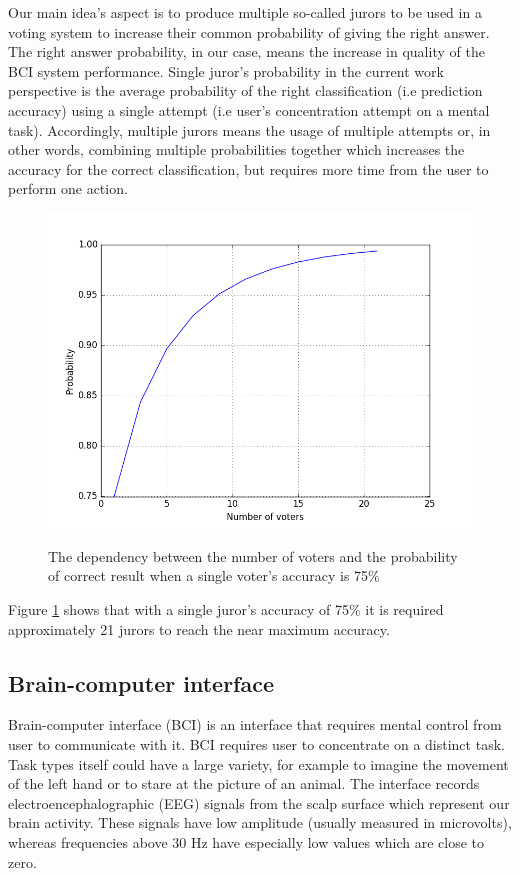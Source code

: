 \documentclass[12pt]{article}
\theoremstyle{definition}
\begin{document}
Our main idea's aspect is to produce multiple so-called jurors to be used in a voting system to increase their common probability of giving the right answer. The right answer probability, in our case, means the increase in quality of the BCI system performance. Single juror's probability in the current work perspective is the average probability of the right classification (i.e prediction accuracy) using a single attempt (i.e user's concentration attempt on a mental task). Accordingly, multiple jurors means the usage of multiple attempts or, in other words, combining multiple probabilities together which increases the accuracy for the correct classification, but requires more time from the user to perform one action.
\begin{figure} [H]
\begin{center}
\label{fig:condorcet123}
\includegraphics[width=1\textwidth]{condorcet}
\caption{The dependency between the number of voters and the probability of correct result when a single voter's accuracy is 75\%}
\end{center}
\end{figure}

Figure \ref{fig:condorcet123} shows that with a single juror's accuracy of 75\% it is required approximately 21 jurors to reach the near maximum accuracy.
\subsection{Brain-computer interface}

Brain-computer interface (BCI) is an interface that requires mental control from user to communicate with it. BCI requires user to concentrate on a distinct task. Task types itself could have a large variety, for example to imagine the movement of the left hand or to stare at the picture of an animal. The interface records electroencephalographic (EEG) signals from the scalp surface which represent our brain activity. These signals have low amplitude (usually measured in microvolts), whereas frequencies above 30 Hz have especially low values which are close to zero. \cite{bci_vidal}
\end{document}
